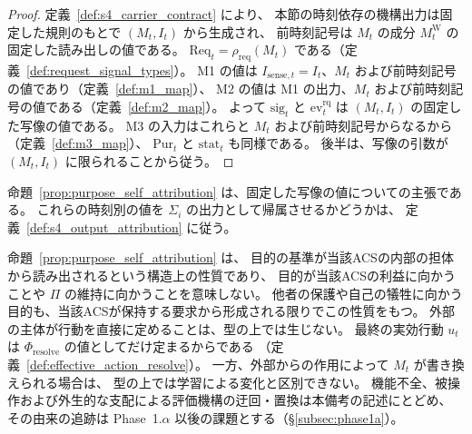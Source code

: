 \begin{proof}
定義~\ref{def:s4_carrier_contract} により、
本節の時刻依存の機構出力は固定した規則のもとで $(M_t,I_t)$ から生成され、
前時刻記号は $M_t$ の成分 $M_t^{\mathrm W}$ の固定した読み出しの値である。
$\mathrm{Req}_t=\rho_{\mathrm{req}}(M_t)$ である（定義~\ref{def:request_signal_types}）。
M1 の値は $I_{\mathrm{sense},t}=I_t$、$M_t$ および前時刻記号の値であり（定義~\ref{def:m1_map}）、
M2 の値は M1 の出力、$M_t$ および前時刻記号の値である（定義~\ref{def:m2_map}）。
よって $\mathrm{sig}_t$ と $\mathrm{ev}^{\mathrm{rq}}_t$ は $(M_t,I_t)$ の固定した写像の値である。
M3 の入力はこれらと $M_t$ および前時刻記号からなるから（定義~\ref{def:m3_map}）、
$\mathrm{Pur}_t$ と $\mathrm{stat}_t$ も同様である。
後半は、写像の引数が $(M_t,I_t)$ に限られることから従う。
\end{proof}

命題~\ref{prop:purpose_self_attribution} は、固定した写像の値についての主張である。
これらの時刻別の値を $\Sigma_i$ の出力として帰属させるかどうかは、
定義~\ref{def:s4_output_attribution} に従う。

\begin{remark}[自己帰属性の射程と異常域]
\label{rem:self_attribution_scope}
命題~\ref{prop:purpose_self_attribution} は、
目的の基準が当該ACSの内部の担体から読み出されるという構造上の性質であり、
目的が当該ACSの利益に向かうことや $\Pi$ の維持に向かうことを意味しない。
他者の保護や自己の犠牲に向かう目的も、当該ACSが保持する要求から形成される限りでこの性質をもつ。
外部の主体が行動を直接に定めることは、型の上では生じない。
最終の実効行動 $u_t$ は $\Phi_{\mathrm{resolve}}$ の値としてだけ定まるからである
（定義~\ref{def:effective_action_resolve}）。
一方、外部からの作用によって $M_t$ が書き換えられる場合は、
型の上では学習による変化と区別できない。
機能不全、被操作および外生的な支配による評価機構の迂回・置換は本備考の記述にとどめ、
その由来の追跡は Phase~1.$\alpha$ 以後の課題とする（\S\ref{subsec:phase1a}）。
\end{remark}

